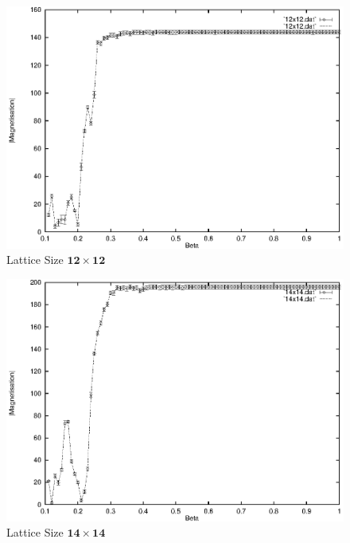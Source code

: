 \documentclass[a4paper]{IEEEtran}
\begin{document}
    \begin{figure} 
    \caption{Lattice Size $\mathbf{12 \times 12}$}
    \label{fig:12x12-1} 
    \begin{center}
        \includegraphics[width=0.99\columnwidth]{12x12_1.eps}
    \end{center}
    \end{figure} 

    \begin{figure} 
    \caption{Lattice Size $\mathbf{14 \times 14}$}
    \label{fig:14x14-1}
    \begin{center}
        \includegraphics[width=0.99\columnwidth]{14x14_1.eps}
    \end{center}
    \end{figure} 
\end{document}
